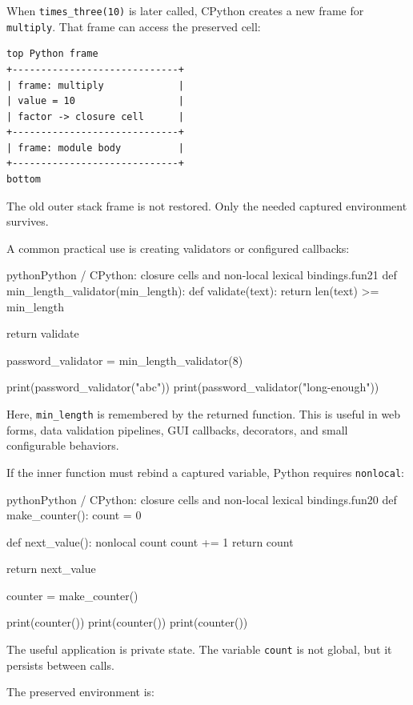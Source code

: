 When \texttt{times\_three(10)} is later called, CPython creates a new frame for \texttt{multiply}. That frame can access the preserved cell:

\begin{verbatim}
top Python frame
+-----------------------------+
| frame: multiply             |
| value = 10                  |
| factor -> closure cell      |
+-----------------------------+
| frame: module body          |
+-----------------------------+
bottom
\end{verbatim}

The old outer stack frame is not restored. Only the needed captured environment survives.

A common practical use is creating validators or configured callbacks:

\begin{codebox}[]{python}{Python / CPython: closure cells and non-local lexical bindings.}{fun21}
def min_length_validator(min_length):
    def validate(text):
        return len(text) >= min_length

    return validate


password_validator = min_length_validator(8)

print(password_validator("abc"))
print(password_validator("long-enough"))
\end{codebox}


Here, \texttt{min\_length} is remembered by the returned function. This is useful in web forms, data validation pipelines, GUI callbacks, decorators, and small configurable behaviors.

If the inner function must rebind a captured variable, Python requires \texttt{nonlocal}:

\begin{codebox}[]{python}{Python / CPython: closure cells and non-local lexical bindings.}{fun20}
def make_counter():
    count = 0

    def next_value():
        nonlocal count
        count += 1
        return count

    return next_value


counter = make_counter()

print(counter())
print(counter())
print(counter())
\end{codebox}


The useful application is private state. The variable \texttt{count} is not global, but it persists between calls.

The preserved environment is:

